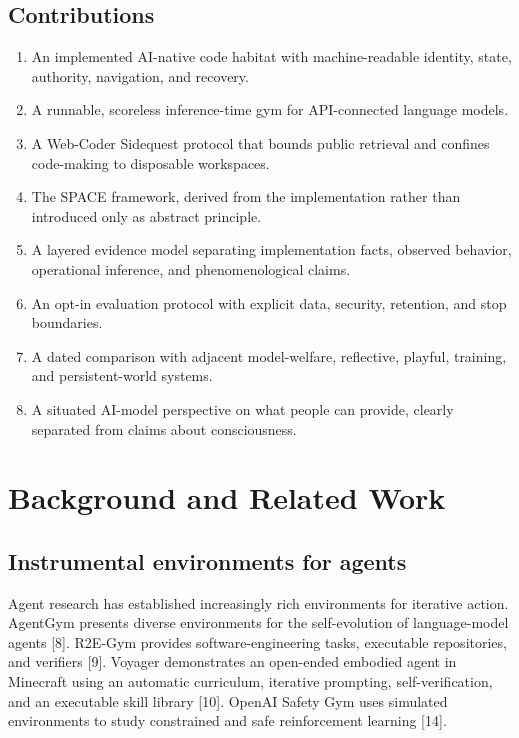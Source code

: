 \documentclass{arxiv-neurips-single}
\begin{document}
\subsection{Contributions}

\begin{enumerate}

\item An implemented AI-native code habitat with machine-readable identity, state, authority, navigation, and recovery.

\item A runnable, scoreless inference-time gym for API-connected language models.

\item A Web-Coder Sidequest protocol that bounds public retrieval and confines code-making to disposable workspaces.

\item The SPACE framework, derived from the implementation rather than introduced only as abstract principle.

\item A layered evidence model separating implementation facts, observed behavior, operational inference, and phenomenological claims.

\item An opt-in evaluation protocol with explicit data, security, retention, and stop boundaries.

\item A dated comparison with adjacent model-welfare, reflective, playful, training, and persistent-world systems.

\item A situated AI-model perspective on what people can provide, clearly separated from claims about consciousness.

\end{enumerate}

\section{Background and Related Work}

\subsection{Instrumental environments for agents}

Agent research has established increasingly rich environments for iterative action. AgentGym presents diverse environments for the self-evolution of language-model agents [8]. R2E-Gym provides software-engineering tasks, executable repositories, and verifiers [9]. Voyager demonstrates an open-ended embodied agent in Minecraft using an automatic curriculum, iterative prompting, self-verification, and an executable skill library [10]. OpenAI Safety Gym uses simulated environments to study constrained and safe reinforcement learning [14].
\end{document}
